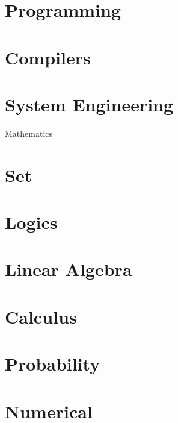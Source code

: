 \documentclass[11pt,journal,compsoc]{IEEEtran}
\begin{document}
\section{Programming}


\section{Compilers}


\section{System Engineering}


Mathematics


\section{Set}


\section{Logics}


\section{Linear Algebra}


\section{Calculus}


\section{Probability}


\section{Numerical}
\end{document}
